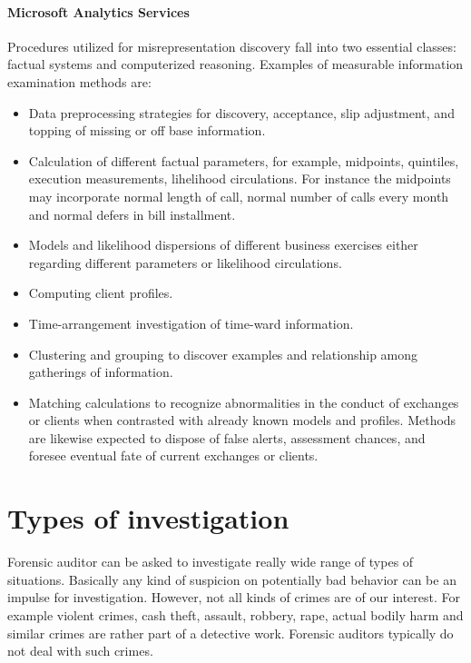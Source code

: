 {\paragraph{Microsoft Analytics Services}
Procedures utilized for misrepresentation discovery fall into two essential classes: factual systems and computerized reasoning. Examples of measurable information examination methods are: 

\begin{itemize}
\item Data preprocessing strategies for discovery, acceptance, slip adjustment, and topping of missing or off base information.
\item Calculation of different factual parameters, for example, midpoints, quintiles, execution measurements, lihelihood circulations. For instance the midpoints may incorporate normal length of call, normal number of calls every month and normal defers in bill installment.
\item Models and likelihood dispersions of different business exercises either regarding different parameters or likelihood circulations.
\item Computing client profiles.
\item Time-arrangement investigation of time-ward information.
\item Clustering and grouping to discover examples and relationship among gatherings of information.
\item Matching calculations to recognize abnormalities in the conduct of exchanges or clients when contrasted with already known models and profiles. Methods are likewise expected to dispose of false alerts, assessment chances, and foresee eventual fate of current exchanges or clients. %
\end{itemize}


}



\section{Types of investigation}

Forensic auditor can be asked to investigate really wide range of types of situations. Basically any kind of suspicion on potentially bad behavior can be an impulse for investigation. However, not all kinds of crimes are of our interest. For example violent crimes, cash theft, assault, robbery, rape, actual bodily harm and similar crimes are rather part of a detective work. Forensic auditors typically do not deal with such crimes. 

